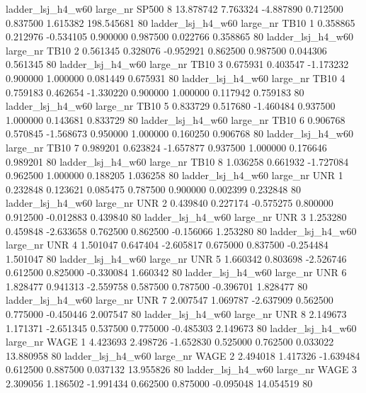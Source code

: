   ladder_lsj_h4_w60   large_nr    SP500                 8 13.878742  7.763324  -4.887890 0.712500 0.837500  1.615382  198.545681 80
  ladder_lsj_h4_w60   large_nr     TB10                 1  0.358865  0.212976  -0.534105 0.900000 0.987500  0.022766    0.358865 80
  ladder_lsj_h4_w60   large_nr     TB10                 2  0.561345  0.328076  -0.952921 0.862500 0.987500  0.044306    0.561345 80
  ladder_lsj_h4_w60   large_nr     TB10                 3  0.675931  0.403547  -1.173232 0.900000 1.000000  0.081449    0.675931 80
  ladder_lsj_h4_w60   large_nr     TB10                 4  0.759183  0.462654  -1.330220 0.900000 1.000000  0.117942    0.759183 80
  ladder_lsj_h4_w60   large_nr     TB10                 5  0.833729  0.517680  -1.460484 0.937500 1.000000  0.143681    0.833729 80
  ladder_lsj_h4_w60   large_nr     TB10                 6  0.906768  0.570845  -1.568673 0.950000 1.000000  0.160250    0.906768 80
  ladder_lsj_h4_w60   large_nr     TB10                 7  0.989201  0.623824  -1.657877 0.937500 1.000000  0.176646    0.989201 80
  ladder_lsj_h4_w60   large_nr     TB10                 8  1.036258  0.661932  -1.727084 0.962500 1.000000  0.188205    1.036258 80
  ladder_lsj_h4_w60   large_nr      UNR                 1  0.232848  0.123621   0.085475 0.787500 0.900000  0.002399    0.232848 80
  ladder_lsj_h4_w60   large_nr      UNR                 2  0.439840  0.227174  -0.575275 0.800000 0.912500 -0.012883    0.439840 80
  ladder_lsj_h4_w60   large_nr      UNR                 3  1.253280  0.459848  -2.633658 0.762500 0.862500 -0.156066    1.253280 80
  ladder_lsj_h4_w60   large_nr      UNR                 4  1.501047  0.647404  -2.605817 0.675000 0.837500 -0.254484    1.501047 80
  ladder_lsj_h4_w60   large_nr      UNR                 5  1.660342  0.803698  -2.526746 0.612500 0.825000 -0.330084    1.660342 80
  ladder_lsj_h4_w60   large_nr      UNR                 6  1.828477  0.941313  -2.559758 0.587500 0.787500 -0.396701    1.828477 80
  ladder_lsj_h4_w60   large_nr      UNR                 7  2.007547  1.069787  -2.637909 0.562500 0.775000 -0.450446    2.007547 80
  ladder_lsj_h4_w60   large_nr      UNR                 8  2.149673  1.171371  -2.651345 0.537500 0.775000 -0.485303    2.149673 80
  ladder_lsj_h4_w60   large_nr     WAGE                 1  4.423693  2.498726  -1.652830 0.525000 0.762500  0.033022   13.880958 80
  ladder_lsj_h4_w60   large_nr     WAGE                 2  2.494018  1.417326  -1.639484 0.612500 0.887500  0.037132   13.955826 80
  ladder_lsj_h4_w60   large_nr     WAGE                 3  2.309056  1.186502  -1.991434 0.662500 0.875000 -0.095048   14.054519 80
